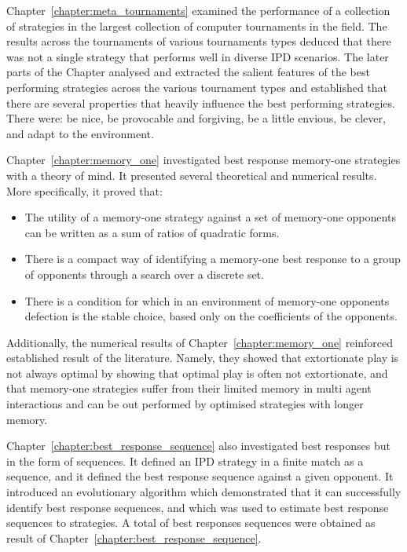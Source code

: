 Chapter~\ref{chapter:meta_tournaments} examined the performance of a collection
of \numberofstrategies strategies in the largest collection of computer
tournaments in the field. The results across the \numberofalltournaments
tournaments of various tournaments types deduced that there was not a single strategy that
performs well in diverse IPD scenarios.
The later parts of the Chapter analysed and extracted the salient features of the best
performing strategies across the various tournament types and established that there
are several properties that heavily influence the best performing
strategies. There were: be nice, be provocable and forgiving, be
a little envious, be clever, and adapt to the environment.

Chapter~\ref{chapter:memory_one} investigated best response memory-one
strategies with a theory of mind. It presented
several theoretical and numerical results. More specifically, it proved that:

\begin{itemize}
    \item The utility of a
    memory-one strategy against a set of memory-one opponents can be written as a
    sum of ratios of quadratic forms.
    \item There is a compact way of identifying
    a memory-one best response to a group of opponents through a search over a
    discrete set.
    \item There is a condition for which in an environment of
    memory-one opponents defection is the stable choice, based only on the
    coefficients of the opponents.
\end{itemize}

Additionally, the numerical results of Chapter~\ref{chapter:memory_one}
reinforced established result of the literature. Namely, they showed that
extortionate play is not always optimal by showing that optimal play is often
not extortionate, and that memory-one strategies suffer from their limited
memory in multi agent interactions and can be out performed by optimised
strategies with longer memory.

Chapter~\ref{chapter:best_response_sequence} also investigated best responses
but in the form of sequences. It defined an IPD strategy in a finite match as
a sequence, and it defined the best response sequence against a given opponent.
It introduced an evolutionary algorithm which demonstrated that it can
successfully identify best response sequences, and which was used to estimate best
response sequences to \numberofstrategiesbestsequences strategies. A total
of \totalsequences best responses sequences were obtained as result of
Chapter~\ref{chapter:best_response_sequence}.

